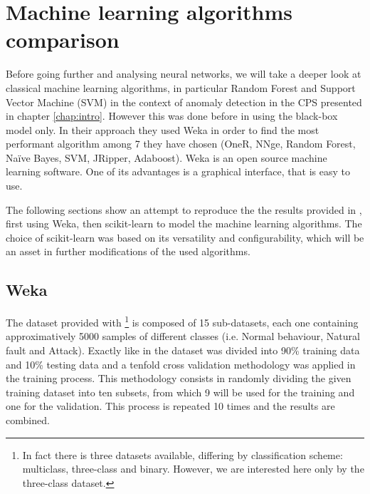 \chapter{Machine learning algorithms comparison} \label{chap:methods}

Before going further and analysing neural networks, we will take a deeper look at classical machine learning algorithms, in particular Random Forest and Support Vector Machine (SVM) in the context of anomaly detection in the CPS presented in chapter \ref{chap:intro}. However this was done before in \cite{borges_hink_machine_2014-1} using the black-box model only. In their approach they used Weka \cite{witten_appendix_2017} in order to find the most performant algorithm among 7 they have chosen (OneR, NNge, Random Forest, Naïve Bayes, SVM, JRipper, Adaboost). Weka is an open source machine learning software. One of its advantages is a graphical interface, that is easy to use. 

The following sections show an attempt to reproduce the the results provided in \cite{borges_hink_machine_2014-1}, first using Weka, then scikit-learn \cite{pedregosa_scikit-learn_2011} to model the machine learning algorithms. The choice of scikit-learn was based on its versatility and configurability, which will be an asset in further modifications of the used algorithms.

\section{Weka} \label{sec:weka_in_chap:methods}
The dataset provided with \cite{adhikari_power_2014}\footnote{In fact there is three datasets available, differing by classification scheme: multiclass, three-class and binary. However, we are interested here only by the three-class dataset.} is composed of 15 sub-datasets, each one containing approximatively 5000 samples of different classes (i.e. Normal behaviour, Natural fault and Attack). Exactly like in \cite{borges_hink_machine_2014-1} the dataset was divided into 90\% training data and 10\% testing data and a tenfold cross validation methodology was applied in the training process. This methodology consists in randomly dividing the given training dataset into ten subsets, from which 9 will be used for the training and one for the validation. This process is repeated 10 times and the results are combined.  

